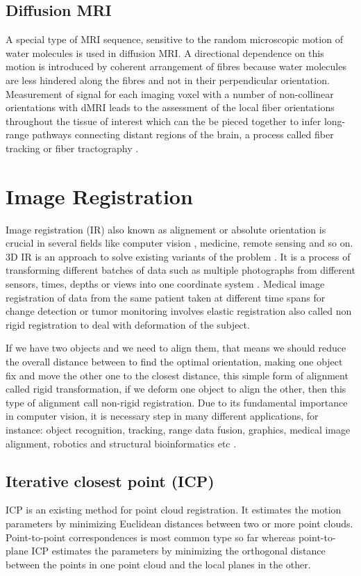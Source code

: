 \documentclass[../structure.tex]{subfiles}
\begin{document}
\subsection{Diffusion MRI}
A special type of MRI sequence, sensitive to the random microscopic motion of water molecules is used in diffusion MRI. A directional dependence on this motion is introduced by coherent arrangement of fibres because water molecules are less hindered along the fibres and not in their perpendicular orientation. Measurement of signal for each imaging voxel with a number of non-collinear orientations with dMRI leads to the assessment of the local fiber orientations throughout the tissue of interest which can the be pieced together to infer long-range pathways connecting distant regions of the brain, a process called fiber tracking or fiber tractography \cite{Jeurissen2017}.

\section{Image Registration}
Image registration (IR) also known as alignement or absolute orientation is crucial in several fields like computer vision , medicine, remote sensing and so on. 3D IR is an approach to solve existing variants of the problem \cite{Cordon2006}. It is a process of transforming different batches of data such as multiple photographs from different sensors, times, depths or views into one coordinate system . Medical image registration of data from the same patient taken at different time spans for change detection or tumor monitoring involves elastic registration also called non rigid registration to deal with deformation of the subject.

If we have two objects and we need to align them, that means we should reduce the overall distance between to find the optimal orientation, making one object fix and move the other one to the closest distance, this simple form of alignment called rigid transformation, if we deform one object to align the other, then this type of alignment call non-rigid registration. Due to its fundamental importance in computer vision, it is necessary step in many different applications, for instance: object recognition, tracking, range data fusion, graphics, medical image alignment, robotics and structural bioinformatics etc \cite{Li2007}.

		\subsection{Iterative closest point (ICP)}
		ICP is an existing method for point cloud registration.  It estimates the motion parameters by minimizing Euclidean distances between two or more point clouds. Point-to-point correspondences is most common type so far whereas point-to-plane ICP estimates the parameters by minimizing the orthogonal distance between the points in one point cloud and the local planes in the other.
		
\end{document}
